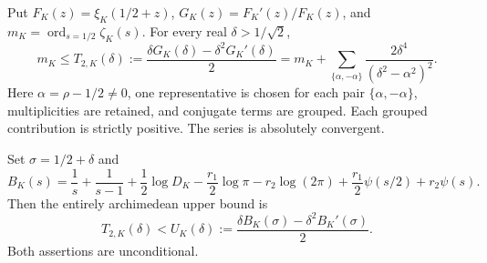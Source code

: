 \begin{theorem}
\label{thm:analytic-central-order-test}
Put $F_K(z)=\xi_K(1/2+z)$,
$G_K(z)=F_K'(z)/F_K(z)$, and
$m_K=\operatorname{ord}_{s=1/2}\zeta_K(s)$. For every real
$\delta>1/\sqrt2$,
\begin{equation}\label{eq:analytic-T2-order}
 m_K\le T_{2,K}(\delta):=
 \frac{\delta G_K(\delta)-\delta^2G_K'(\delta)}2
 =m_K+\sum_{\{\alpha,-\alpha\}}
                 \frac{2\delta^4}{(\delta^2-\alpha^2)^2}.
\end{equation}
Here $\alpha=\rho-1/2\ne0$, one representative is chosen for
each pair $\{\alpha,-\alpha\}$, multiplicities are retained,
and conjugate terms are grouped. Each grouped contribution is
strictly positive. The series is absolutely convergent.

Set $\sigma=1/2+\delta$ and
\[
 B_K(s)=\frac1s+\frac1{s-1}+\frac12\log D_K
       -\frac{r_1}2\log\pi-r_2\log(2\pi)
       +\frac{r_1}2\psi(s/2)+r_2\psi(s).
\]
Then the entirely archimedean upper bound is
\begin{equation}\label{eq:analytic-T2-arch}
 T_{2,K}(\delta)<
 U_K(\delta):=
       \frac{\delta B_K(\sigma)-\delta^2B_K'(\sigma)}2.
\end{equation}
Both assertions are unconditional.
\end{theorem}

